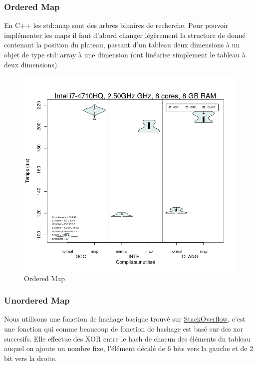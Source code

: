 \documentclass[
 aip,
 jmp,
 amsmath,amssymb,
 reprint
]{revtex4-1}
\begin{document}
\subsubsection{Ordered Map}
En C++ les std::map sont des arbres binaires de recherche. Pour pouvoir implémenter les maps il faut d'abord changer légèrement la structure de donné contenant la position du plateau, passant d'un tableau deux dimensions à un objet de type std::array à une dimension (ont linéarise simplement le tableau à deux dimensions).

\begin{figure}[H]
  \includegraphics[width=\linewidth, keepaspectratio=true]{sorted_map.png}
  \caption{Ordered Map}
\end{figure}

\subsubsection{Unordered Map}
Nous utilisons une fonction de hachage basique trouvé sur \href{https://stackoverflow.com/a/42701911}{StackOverflow}, c'est une fonction qui comme beaucoup de fonction de hashage est basé sur des xor succesifs. Elle effectue des XOR entre le hash de chacun des éléments du tableau auquel on ajoute un nombre fixe, l'élément décalé de 6 bits vers la gauche et de 2 bit vers la droite.
\end{document}
